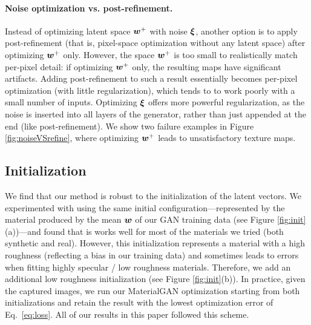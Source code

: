 \paragraph{Noise optimization vs. post-refinement.}
\label{ssec:post-refine}
%
Instead of optimizing latent space $\bm{w}^+$ with noise $\bm{\xi}$, another option is to apply post-refinement (that is, pixel-space optimization without any latent space) after optimizing $\bm{w}^+$ only. However, the space $\bm{w}^+$ is too small to realistically match per-pixel detail: if optimizing $\bm{w}^+$ only, the resulting maps have significant artifacts. Adding post-refinement to such a result essentially becomes per-pixel optimization (with little regularization), which tends to to work poorly with a small number of inputs. Optimizing $\bm{\xi}$ offers more powerful regularization, as the noise is inserted into all layers of the generator, rather than just appended at the end (like post-refinement). We show two failure examples in Figure \ref{fig:noiseVSrefine}, where optimizing $\bm{w}^+$ leads to unsatisfactory texture maps.
%

%
\subsection{Initialization}
\label{ssec:init}
%
We find that our method is robust to the initialization of the latent vectors. We experimented with using the same initial configuration---represented by the material produced by the mean $\bm{w}$ of our GAN training data (see Figure \ref{fig:init}(a))---and found that is works well for most of the materials we tried (both synthetic and real).
However, this initialization represents a material with a high roughness (reflecting a bias in our training data) and sometimes leads to errors when fitting highly specular / low roughness materials.
Therefore, we add an additional low roughness initialization (see Figure \ref{fig:init}(b)).
In practice, given the captured images, we run our MaterialGAN optimization starting from both initializations and retain the result with the lowest optimization error of Eq.~\eqref{eq:loss}.
All of our results in this paper followed this scheme.
%